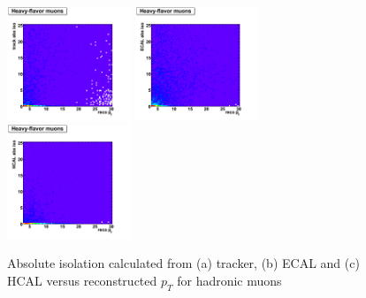  \begin{figure}[htbp]
    \includegraphics[width = 0.33\textwidth]{pictures/recoPt_absIso/trackIso_muon_nonPrompt.png}
    \includegraphics[width = 0.33\textwidth]{pictures/recoPt_absIso/ecalIso_muon_nonPrompt.png}
    \includegraphics[width = 0.33\textwidth]{pictures/recoPt_absIso/hcalIso_muon_nonPrompt.png}
    \caption{Absolute isolation calculated from (a) tracker, (b) ECAL and (c) HCAL versus
       reconstructed $p_{T}$ for hadronic muons}
    \label{fig:NonPromptMuonRecoPt_AbsIso}
 \end{figure}

